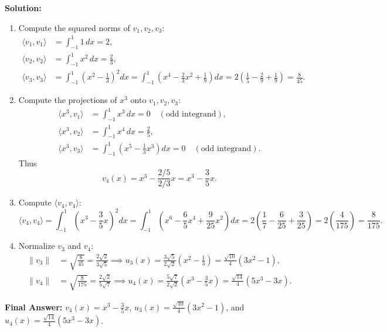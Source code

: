 \documentclass[11pt, letterpaper]{article}
\theoremstyle{definition}
\theoremstyle{remark}
\begin{document}
\textbf{Solution:}
\begin{enumerate}[label=\textbf{Step \arabic*:}]
    \item Compute the squared norms of $v_1, v_2, v_3$:
    \begin{align*}
        \langle v_1, v_1 \rangle &= \int_{-1}^1 1\,dx = 2, \\
        \langle v_2, v_2 \rangle &= \int_{-1}^1 x^2\,dx = \frac{2}{3}, \\
        \langle v_3, v_3 \rangle &= \int_{-1}^1 \left(x^2 - \frac{1}{3}\right)^2 dx = \int_{-1}^1 \left(x^4 - \frac{2}{3}x^2 + \frac{1}{9}\right) dx = 2\left(\frac{1}{5} - \frac{2}{9} + \frac{1}{9}\right) = \frac{8}{45}.
    \end{align*}
    \item Compute the projections of $x^3$ onto $v_1, v_2, v_3$:
    \begin{align*}
        \langle x^3, v_1 \rangle &= \int_{-1}^1 x^3\,dx = 0 \quad (\text{odd integrand}), \\
        \langle x^3, v_2 \rangle &= \int_{-1}^1 x^4\,dx = \frac{2}{5}, \\
        \langle x^3, v_3 \rangle &= \int_{-1}^1 \left(x^5 - \frac{1}{3}x^3\right) dx = 0 \quad (\text{odd integrand}).
    \end{align*}
    Thus
    \[
        v_4(x) = x^3 - \frac{2/5}{2/3} x = x^3 - \frac{3}{5} x.
    \]
    \item Compute $\langle v_4, v_4 \rangle$:
    \[
        \langle v_4, v_4 \rangle = \int_{-1}^1 \left(x^3 - \frac{3}{5}x\right)^2 dx = \int_{-1}^1 \left(x^6 - \frac{6}{5}x^4 + \frac{9}{25}x^2\right) dx = 2\left(\frac{1}{7} - \frac{6}{25} + \frac{3}{25}\right) = 2\left(\frac{4}{175}\right) = \frac{8}{175}.
    \]
    \item Normalize $v_3$ and $v_4$:
    \begin{align*}
        \|v_3\| &= \sqrt{\frac{8}{45}} = \frac{2\sqrt{2}}{3\sqrt{5}} \implies u_3(x) = \frac{3\sqrt{5}}{2\sqrt{2}}\left(x^2 - \frac{1}{3}\right) = \frac{\sqrt{10}}{4}(3x^2 - 1), \\
        \|v_4\| &= \sqrt{\frac{8}{175}} = \frac{2\sqrt{2}}{5\sqrt{7}} \implies u_4(x) = \frac{5\sqrt{7}}{2\sqrt{2}}\left(x^3 - \frac{3}{5}x\right) = \frac{\sqrt{14}}{4}(5x^3 - 3x).
    \end{align*}
\end{enumerate}
\textbf{Final Answer:} $v_4(x) = x^3 - \frac{3}{5}x$, $u_3(x) = \frac{\sqrt{10}}{4}(3x^2 - 1)$, and $u_4(x) = \frac{\sqrt{14}}{4}(5x^3 - 3x)$.
\end{document}
